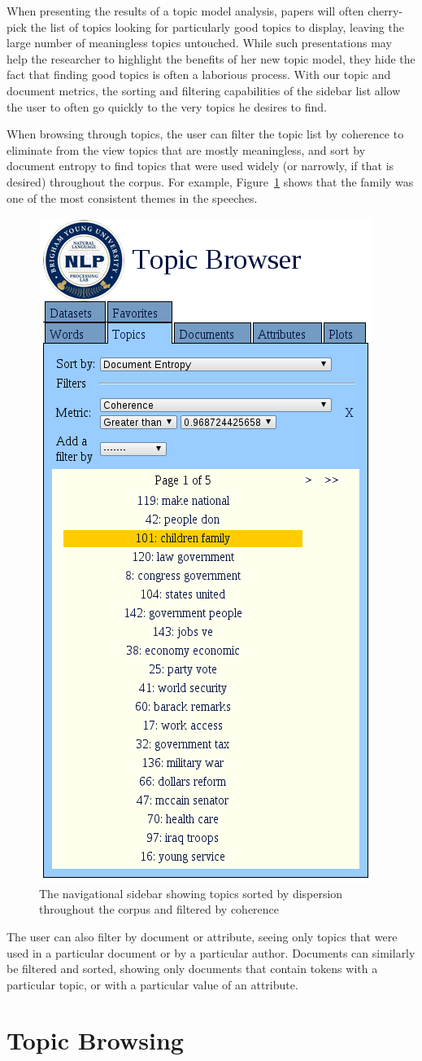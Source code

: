 \documentclass{article}
\begin{document}
When presenting the results of a topic model analysis, papers will often
cherry-pick the list of topics looking for particularly good topics to display,
leaving the large number of meaningless topics untouched.  While such
presentations may help the researcher to highlight the benefits of her new
topic model, they hide the fact that finding good topics is often a laborious
process.  With our topic and document metrics, the sorting and filtering
capabilities of the sidebar list allow the user to often go quickly to the very
topics he desires to find.

When browsing through topics, the user can filter the topic list by coherence
to eliminate from the view topics that are mostly meaningless, and sort by
document entropy to find topics that were used widely (or narrowly, if that is
desired) throughout the corpus.  For example, Figure~\ref{fig:sidebar} shows
that the family was one of the most consistent themes in the speeches.

\begin{figure}
  \centering
  \includegraphics[width=.34\textwidth]{sidebar}
  \caption{The navigational sidebar showing topics sorted by dispersion
  throughout the corpus and filtered by coherence}
  \label{fig:sidebar}
\end{figure}

The user can also filter by document or attribute, seeing only topics that were
used in a particular document or by a particular author.  Documents can
similarly be filtered and sorted, showing only documents that contain tokens
with a particular topic, or with a particular value of an attribute.

\section{Topic Browsing}
\end{document}

